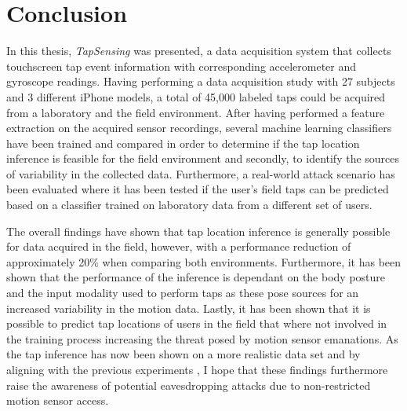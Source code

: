 \chapter{Conclusion\label{cha:chapter7}}
In this thesis, \textit{TapSensing} was presented, a data acquisition system that collects touchscreen tap event information with corresponding accelerometer and gyroscope readings. Having performing a data acquisition study with 27 subjects and 3 different iPhone models, a total of 45,000 labeled taps could be acquired from a laboratory and the field environment. After having performed a feature extraction on the acquired sensor recordings, several machine learning classifiers have been trained and compared in order to determine if the tap location inference is feasible for the field environment and secondly, to identify the sources of variability in the collected data. Furthermore, a real-world attack scenario has been evaluated where it has been tested if the user's field taps can be predicted based on a classifier trained on laboratory data from a different set of users.

The overall findings have shown that tap location inference is generally possible for data acquired in the field, however, with a performance reduction of approximately 20\% when comparing both environments. Furthermore, it has been shown that the performance of the inference is dependant on the body posture and the input modality used to perform taps as these pose sources for an increased variability in the motion data. Lastly, it has been shown that it is possible to predict tap locations of users in the field that where not involved in the training process increasing the threat posed by motion sensor emanations. As the tap inference has now been shown on a more realistic data set and by aligning with the previous experiments \cite{Touchlogger, Tapprints, Accessory}, I hope that these findings furthermore raise the awareness of potential eavesdropping attacks due to non-restricted motion sensor access.



